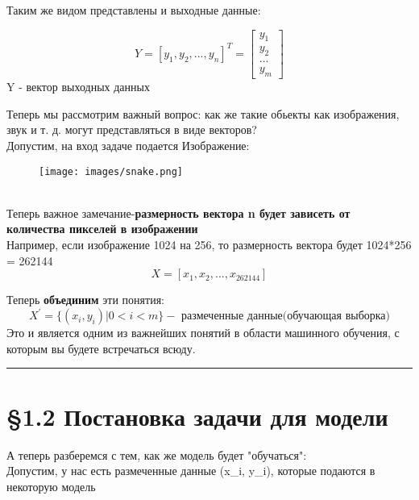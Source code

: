 Таким же видом представлены и выходные данные:

\[
    Y = [y_1, y_2, ... , y_n ]^T = \begin{bmatrix}
                                       y_1 \\
                                       y_2 \\
                                       ...\\
                                       y_m
                                       \end{bmatrix}
\]
Y - вектор выходных данных

\newpage
Теперь мы рассмотрим важный вопрос: как же такие обьекты как изображения, звук и т. д. могут представляться в виде векторов? \\
\vspace{1cm}
    Допустим, на вход задаче подается Изображение:
    \begin{figure}[htbp]
        \centering
        \texttt{[image: images/snake.png]}
        \label{fig:example}
    \end{figure}
\\
    Теперь важное замечание-\textbf{размерность вектора n будет зависеть от количества пикселей в изображении} \\
    \vspace{1cm}
    Например, если изображение 1024 на 256, то размерность вектора будет 1024*256 = 262144
    \vspace{0.9cm}
    \[X = [x_1, x_2, ... , x_{262144} ]
    \]

    \centering
    \vspace{1cm}
    Теперь \textbf{объединим} эти понятия:
    \[
        X^{'} = \{(x_i, y_i ) | 0 < i < m\} - \textbf{ размеченные данные(обучающая выборка)}
    \]
    Это и является одним из важнейших понятий в области машинного обучения, с которым вы будете встречаться всюду.
\noindent\rule{\linewidth}{0.4pt}

    \newpage
    \centering
    \section*{\S 1.2 Постановка задачи для модели}
    \vspace{1em}
\raggedright
    А теперь разберемся с тем, как же модель будет "обучаться": \\
    \vspace{0.8cm}
    Допустим, у нас есть размеченные данные (x_i, y_i), которые подаются в некоторую модель

